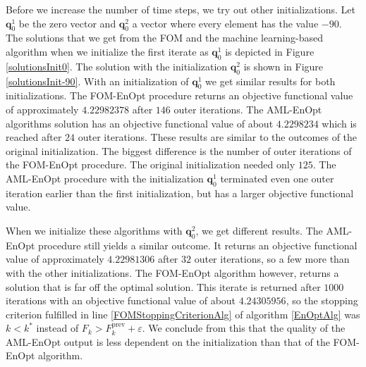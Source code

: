 Before we increase the number of time steps, we try out other initializations. Let $\mathbf{q}^1_0$ be the zero vector and $\mathbf{q}^2_0$ a vector where every element has the value $-90$. The solutions that we get from the FOM and the machine learning-based algorithm when we initialize the first iterate as $\mathbf{q}^1_0$ is depicted in Figure \ref{solutionsInit0}. The solution with the initialization $\mathbf{q}^2_0$ is shown in Figure \ref{solutionsInit-90}. With an initialization of $\mathbf{q}^1_0$ we get similar results for both initializations. The FOM-EnOpt procedure returns an objective functional value of approximately $4.22982378$ after $146$ outer iterations. The AML-EnOpt algorithms solution has an objective functional value of about $4.2298234$ which is reached after $24$ outer iterations. These results are similar to the outcomes of the original initialization. The biggest difference is the number of outer iterations of the FOM-EnOpt procedure. The original initialization needed only $125$. The AML-EnOpt procedure with the initialization $\mathbf{q}^1_0$ terminated even one outer iteration earlier than the first initialization, but has a larger objective functional value.

When we initialize these algorithms with $\mathbf{q}^2_0$, we get different results. The AML-EnOpt procedure still yields a similar outcome. It returns an objective functional value of approximately $4.22981306$ after $32$ outer iterations, so a few more than with the other initializations. The FOM-EnOpt algorithm however, returns a solution that is far off the optimal solution. This iterate is returned after $1000$ iterations with an objective functional value of about $4.24305956$, so the stopping criterion fulfilled in line \ref{FOMStoppingCriterionAlg} of algorithm \ref{EnOptAlg} was $k<k^*$ instead of $F_{k}>F^\mathrm{prev}_k+\varepsilon$. We conclude from this that the quality of the AML-EnOpt output is less dependent on the initialization than that of the FOM-EnOpt algorithm.\\

